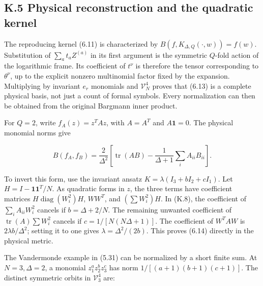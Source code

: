 \hypertarget{k.5-physical-reconstruction-and-the-quadratic-kernel}{%
\subsection{K.5 Physical reconstruction and the quadratic kernel}\label{k.5-physical-reconstruction-and-the-quadratic-kernel}}

The reproducing kernel (6.11) is characterized by \(B(f,K_{\Delta,Q}(\cdot,w))=f(w)\). Substitution of \(\sum_at_aZ^{(a)}\) in its first argument is the symmetric \(Q\)-fold action of the logarithmic frame. Its coefficient of \(t^\nu\) is therefore the tensor corresponding to \(\theta^\nu\), up to the explicit nonzero multinomial factor fixed by the expansion. Multiplying by invariant \(e_r\) monomials and \(\mathcal V_N^4\) proves that (6.13) is a complete physical basis, not just a count of formal symbols. Every normalization can then be obtained from the original Bargmann inner product.

For \(Q=2\), write \(f_A(z)=z^TAz\), with \(A=A^T\) and \(A\mathbf1=0\). The physical monomial norms give

\[
B(f_A,f_B)=\frac2{\Delta^2}
\left[\operatorname{tr}(AB)-\frac1{\Delta+1}\sum_iA_{ii}B_{ii}\right].
\tag{K.8}
\]

To invert this form, use the invariant ansatz \(K=\lambda(I_3+bI_2+cI_1)\). Let \(H=I-\mathbf1\mathbf1^T/N\). As quadratic forms in \(z\), the three terms have coefficient matrices \(H\operatorname{diag}(W_i^2)H\), \(WW^T\), and \((\sum W_i^2)H\). In (K.8), the coefficient of \(\sum_iA_{ii}W_i^2\) cancels if \(b=\Delta+2/N\). The remaining unwanted coefficient of \(\operatorname{tr}(A)\sum W_i^2\) cancels if \(c=1/[N(N\Delta+1)]\). The coefficient of \(W^TAW\) is \(2\lambda b/\Delta^2\); setting it to one gives \(\lambda=\Delta^2/(2b)\). This proves (6.14) directly in the physical metric.

The Vandermonde example in (5.31) can be normalized by a short finite sum. At \(N=3,\Delta=2\), a monomial \(z_1^{a}z_2^{b}z_3^{c}\) has norm \(1/[(a+1)(b+1)(c+1)]\). The distinct symmetric orbits in \(\mathcal V_3^4\) are:

